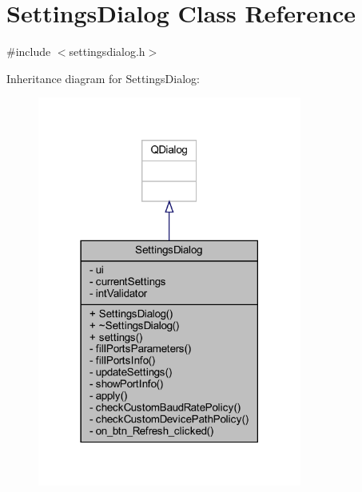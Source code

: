 \hypertarget{class_settings_dialog}{}\section{Settings\+Dialog Class Reference}
\label{class_settings_dialog}


{\ttfamily \#include $<$settingsdialog.\+h$>$}



Inheritance diagram for Settings\+Dialog\+:
\nopagebreak
\begin{figure}[H]
\begin{center}
\leavevmode
\includegraphics[width=246pt]{class_settings_dialog__inherit__graph}
\end{center}
\end{figure}


